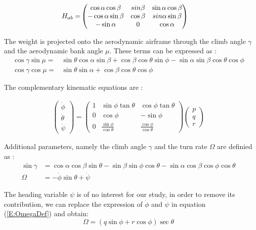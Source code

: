 \begin{align}
H_{ab} =& 
\begin{pmatrix}
\cos\alpha \cos\beta & sin\beta & \sin\alpha \cos\beta\\
-\cos\alpha \sin\beta & \cos\beta & \-sin\alpha \sin\beta\\
-\sin\alpha & 0 & \cos\alpha 
\end{pmatrix}
\end{align}

The weight is projected onto the aerodynamic airframe through the climb angle $\gamma$ and the aerodynamic bank angle $\mu$. These terms can be expressed as \cite{Boiffier}:
\begin{align}
\cos\gamma \sin\mu =& \sin\theta \cos\alpha \sin\beta + \cos\beta\cos\theta\sin\phi - \sin\alpha\sin\beta\cos\theta\cos\phi\\
\cos\gamma \cos\mu =& \sin\theta\sin\alpha + \cos\beta\cos\theta\cos\phi
\end{align}

The complementary kinematic equations are :

\begin{align}
\begin{pmatrix}
\dot{\phi}\\
\dot{\theta}\\
\dot{\psi}
\end{pmatrix}
= \begin{pmatrix}
1 & \sin\phi \tan\theta & \cos\phi \tan\theta\\
0 & \cos\phi & -\sin \phi\\
0 &\frac{\sin\phi}{\cos\theta} & \frac{\cos \phi}{\cos \theta}
\end{pmatrix}
\begin{pmatrix}
p\\
q\\
r
\end{pmatrix} \label{E:kinematics}
\end{align}

Additional parameters, namely the climb angle $\gamma$ and the turn rate $\Omega$ are definied as :
\begin{align}
\sin \gamma &= \cos\alpha\cos\beta\sin\theta - \sin\beta\sin\phi\cos\theta - \sin\alpha\cos\beta\cos\phi\cos\theta \label{E:gammaDef}\\
\Omega &= -\dot{\phi}\sin\theta + \dot{\psi} \label{E:OmegaDef}
\end{align}

The heading variable $\psi$ is of no interest for our study, in order to remove its contribution, we can replace the expression of $\dot{\phi}$ and $\dot{\psi}$ in equation (\ref{E:OmegaDef}) and obtain:
\begin{equation}
\Omega = \left( q \sin \phi + r \cos \phi \right) \sec \theta \label{E:OmegaUse}
\end{equation}

